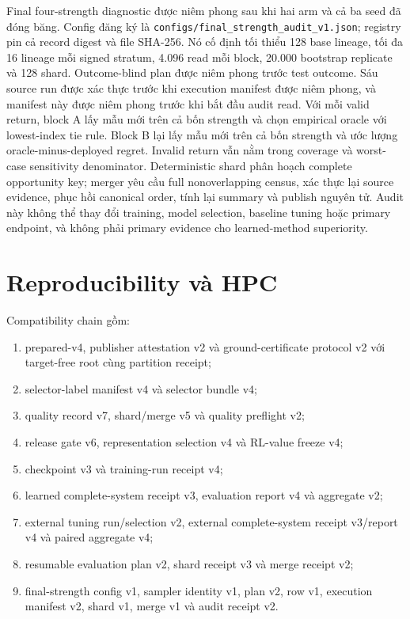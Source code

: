 \documentclass[
  vietnamese,
  10pt,
  a4paper,
]{article}
\providecommand{\tightlist}{%
  \setlength{\itemsep}{0pt}\setlength{\parskip}{0pt}}
\begin{document}
Final four-strength diagnostic được niêm phong sau khi hai arm và cả ba
seed đã đóng băng. Config đăng ký là
\texttt{configs/final\_strength\_audit\_v1.json}; registry pin cả record
digest và file SHA-256. Nó cố định tối thiểu 128 base lineage, tối đa 16
lineage mỗi signed stratum, 4.096 read mỗi block, 20.000 bootstrap
replicate và 128 shard. Outcome-blind plan được niêm phong trước test
outcome. Sáu source run được xác thực trước khi execution manifest được
niêm phong, và manifest này được niêm phong trước khi bắt đầu audit
read. Với mỗi valid return, block A lấy mẫu mới trên cả bốn strength và
chọn empirical oracle với lowest-index tie rule. Block B lại lấy mẫu mới
trên cả bốn strength và ước lượng oracle-minus-deployed regret. Invalid
return vẫn nằm trong coverage và worst-case sensitivity denominator.
Deterministic shard phân hoạch complete opportunity key; merger yêu cầu
full nonoverlapping census, xác thực lại source evidence, phục hồi
canonical order, tính lại summary và publish nguyên tử. Audit này không
thể thay đổi training, model selection, baseline tuning hoặc primary
endpoint, và không phải primary evidence cho learned-method superiority.

\section{Reproducibility và HPC}\label{reproducibility-vuxe0-hpc}

Compatibility chain gồm:

\begin{enumerate}
\def\labelenumi{\arabic{enumi}.}
\tightlist
\item
  prepared-v4, publisher attestation v2 và ground-certificate protocol
  v2 với target-free root cùng partition receipt;
\item
  selector-label manifest v4 và selector bundle v4;
\item
  quality record v7, shard/merge v5 và quality preflight v2;
\item
  release gate v6, representation selection v4 và RL-value freeze v4;
\item
  checkpoint v3 và training-run receipt v4;
\item
  learned complete-system receipt v3, evaluation report v4 và aggregate
  v2;
\item
  external tuning run/selection v2, external complete-system receipt
  v3/report v4 và paired aggregate v4;
\item
  resumable evaluation plan v2, shard receipt v3 và merge receipt v2;
\item
  final-strength config v1, sampler identity v1, plan v2, row v1,
  execution manifest v2, shard v1, merge v1 và audit receipt v2.
\end{enumerate}
\end{document}
